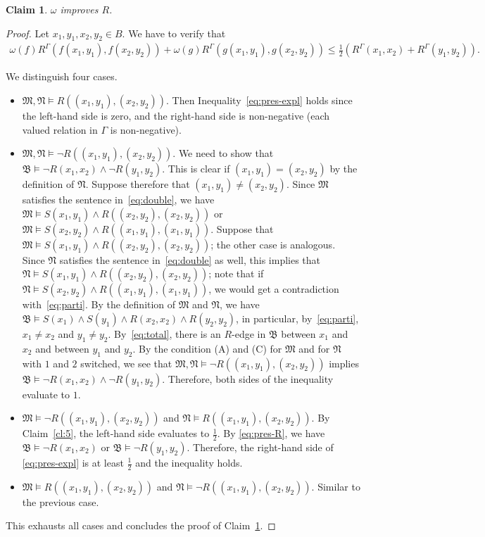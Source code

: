 \documentclass[nonacm]{acmart}
\newcommand{\bB}{{\mathfrak B}}
\newcommand{\bM}{{\mathfrak M}}
\newcommand{\bN}{{\mathfrak N}}
\newtheorem{claim}[theorem]{Claim}
\begin{document}
\begin{claim} \label{cl:8}
$\omega$ improves $R$.
\end{claim}

\begin{proof}
Let $x_1,y_1,x_2,y_2 \in B$. 
We have to verify that 
\begin{align}
\omega(f) R^{\Gamma}(f(x_1,y_1),f(x_2,y_2)) + \omega(g) R^{\Gamma}(g(x_1,y_1),g(x_2,y_2)) \leq \frac{1}{2} (R^{\Gamma}(x_1,x_2) + R^{\Gamma}(y_1,y_2)).
    \label{eq:pres-expl}
\end{align}

We distinguish four cases. 
\begin{itemize}
    \item $\bM,\bN \models R((x_1,y_1),(x_2,y_2))$. 
Then Inequality~\eqref{eq:pres-expl} holds since the left-hand side is zero, and the right-hand side is non-negative (each valued relation in $\Gamma$ is non-negative). 
\item $\bM,\bN \models \neg R((x_1,y_1),(x_2,y_2))$.
We need to show that $\bB \models \neg R(x_1,x_2) \wedge \neg R(y_1,y_2)$. This is clear if $(x_1,y_1)=(x_2,y_2)$ by the definition of $\bN$. Suppose therefore that $(x_1,y_1)\neq(x_2,y_2)$.
Since $\bM$ satisfies the sentence in~\eqref{eq:double}, we have $\bM 
\models S(x_1, y_1) \wedge R((x_2, y_2), (x_2,y_2))$ or $\bM 
\models S(x_2, y_2) \wedge R((x_1, y_1), (x_1,y_1))$. Suppose that $\bM \models S(x_1, y_1) \wedge R((x_2, y_2), (x_2,y_2))$; the other case is analogous.
Since $\bN$ satisfies the sentence in~\eqref{eq:double} as well, this implies that $\bN \models S(x_1, y_1) \wedge R((x_2, y_2), (x_2,y_2))$; note that if $\bN \models S(x_2, y_2) \wedge R((x_1, y_1), (x_1,y_1))$, we would get a contradiction with~\eqref{eq:parti}.
By the definition of $\bM$ and $\bN$, we have $\bB \models S(x_1) \wedge S(y_1) \wedge R(x_2, x_2) \wedge R(y_2,y_2)$, in particular, by~\eqref{eq:parti}, $x_1 \neq x_2$ and $y_1 \neq y_2$. By~\eqref{eq:total}, there is an $R$-edge in $\bB$ between $x_1$ and $x_2$ and between $y_1$ and $y_2$. By the condition (A) and (C) for $\bM$ and for $\bN$ with $1$ and $2$ switched, we see that $\bM,\bN \models \neg R((x_1,y_1),(x_2,y_2))$ implies $\bB \models \neg R(x_1,x_2) \wedge \neg R(y_1,y_2)$.
Therefore, both sides of the inequality evaluate to $1$.
\item $\bM \models \neg R((x_1,y_1),(x_2,y_2))$ and $\bN \models R((x_1,y_1),(x_2,y_2))$. By Claim~\ref{cl:5}, the left-hand side evaluates to $\frac{1}{2}$. By \eqref{eq:pres-R}, we have $\bB \models \neg R(x_1, x_2)$ or $\bB \models \neg R(y_1, y_2)$. Therefore, the right-hand side of \eqref{eq:pres-expl} is at least $\frac{1}{2}$ and the inequality holds. 
\item $\bM \models R((x_1,y_1),(x_2,y_2))$ and $\bN \models \neg R((x_1,y_1),(x_2,y_2))$. 
Similar to the previous case. 
\end{itemize}

This exhausts all cases and concludes the proof of Claim~\ref{cl:8}. 
\end{proof}
\end{document}

